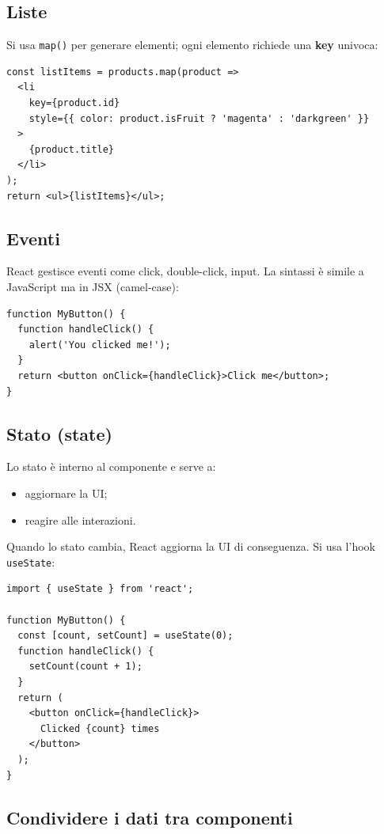 \documentclass[11pt,a4paper]{article}
\begin{document}
\subsection{Liste}

Si usa \texttt{map()} per generare elementi; ogni elemento richiede una \textbf{key} univoca:

\begin{lstlisting}[language=tsx]
const listItems = products.map(product =>
  <li
    key={product.id}
    style={{ color: product.isFruit ? 'magenta' : 'darkgreen' }}
  >
    {product.title}
  </li>
);
return <ul>{listItems}</ul>;
\end{lstlisting}

\subsection{Eventi}

React gestisce eventi come click, double-click, input. La sintassi \`e simile a JavaScript ma in JSX (camel-case):

\begin{lstlisting}[language=tsx]
function MyButton() {
  function handleClick() {
    alert('You clicked me!');
  }
  return <button onClick={handleClick}>Click me</button>;
}
\end{lstlisting}

\subsection{Stato (state)}

Lo stato \`e interno al componente e serve a:
\begin{itemize}[leftmargin=*]
    \item aggiornare la UI;
    \item reagire alle interazioni.
\end{itemize}

Quando lo stato cambia, React aggiorna la UI di conseguenza. Si usa l'hook \texttt{useState}:

\begin{lstlisting}[language=tsx]
import { useState } from 'react';

function MyButton() {
  const [count, setCount] = useState(0);
  function handleClick() {
    setCount(count + 1);
  }
  return (
    <button onClick={handleClick}>
      Clicked {count} times
    </button>
  );
}
\end{lstlisting}

\subsection{Condividere i dati tra componenti}
\end{document}
